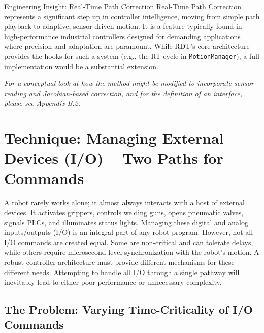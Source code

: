 \begin{tipbox}{Engineering Insight: Real-Time Path Correction}
Real-Time Path Correction represents a significant step up in controller intelligence, moving from simple path playback to adaptive, sensor-driven motion. It is a feature typically found in high-performance industrial controllers designed for demanding applications where precision and adaptation are paramount. While RDT's core architecture provides the hooks for such a system (e.g., the RT-cycle in \texttt{MotionManager}), a full implementation would be a substantial extension.
\end{tipbox}
\textit{For a conceptual look at how the  method might be modified to incorporate sensor reading and Jacobian-based correction, and for the definition of an  interface, please see Appendix B.2.}










\section{Technique: Managing External Devices (I/O) – Two Paths for Commands}
\label{sec:io_management}

A robot rarely works alone; it almost always interacts with a host of external devices. It activates grippers, controls welding guns, opens pneumatic valves, signals PLCs, and illuminates status lights. Managing these digital and analog inputs/outputs (I/O) is an integral part of any robot program. However, not all I/O commands are created equal. Some are non-critical and can tolerate delays, while others require microsecond-level synchronization with the robot's motion. A robust controller architecture must provide different mechanisms for these different needs. Attempting to handle all I/O through a single pathway will inevitably lead to either poor performance or unnecessary complexity.

\subsection{The Problem: Varying Time-Criticality of I/O Commands}
\label{subsec:io_criticality_problem}

